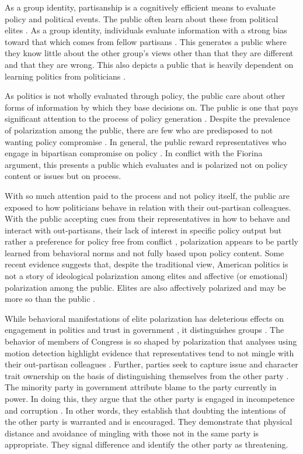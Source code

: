\documentclass [12pt]{article}
\begin{document}
As a group identity, partisanship is a cognitively efficient means to evaluate policy and political events. The public often learn about these from political elites \citep{zaller_1992}. As a group identity, individuals evaluate information with a strong bias toward that which comes from fellow partisans \citep{taber_lodge_2006, taber_lodge_2013,stromback_et-al_2021}.  This generates a public where they know little about the other group's views other than that they are different and that they are wrong. This also depicts a public that is heavily dependent on learning politics from politicians \citep{zaller_1992}. 

As politics is not wholly evaluated through policy, the public care about other forms of information by which they base decisions on. The public is one that pays significant attention to the process of policy generation \citep{hibbing_theiss-morse_2002}. Despite the prevalence of polarization among the public, there are few who are predisposed to not wanting policy compromise \citep{arceneaux_2019}. In general, the public reward representatives who engage in bipartisan compromise on policy \citep{wolak_2020}. In conflict with the Fiorina argument, this presents a public which evaluates and is polarized not on policy content or issues but on process.

With so much attention paid to the process and not policy itself, the public are exposed to how politicians behave in relation with their out-partisan colleagues. With the public accepting cues from their representatives in how to behave and interact with out-partisans, their lack of interest in specific policy output but rather a preference for policy free from conflict \citep{atkinson_2017}, polarization appears to be partly learned from behavioral norms and not fully based upon policy content. Some recent evidence suggests that, despite the traditional view, American politics is not a story of ideological polarization among elites and affective (or emotional) polarization among the public. Elites are also affectively polarized and may be more so than the public \citep{enders_2021}.

While behavioral manifestations of elite polarization has deleterious effects on engagement in politics and trust in government \citep{mutz_reeves_2005}, it distinguishes groups \citep{groenendyk_2018}. The behavior of members of Congress is so shaped by polarization that analyses using motion detection highlight evidence that representatives tend to not mingle with their out-partisan colleagues \citep{dietrich_2021}. Further, parties seek to capture issue and character trait ownership on the basis of distinguishing themselves from the other party \citep{clifford_2020}. The minority party in government attribute blame to the party currently in power. In doing this, they argue that the other party is engaged in incompetence and corruption \citep{lee_2009}. In other words, they establish that doubting the intentions of the other party is warranted and is encouraged. They demonstrate that physical distance and avoidance of mingling with those not in the same party is appropriate. They signal difference and identify the other party as threatening.
\end{document}

